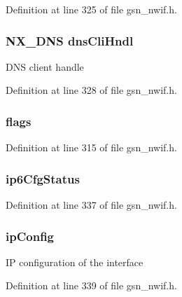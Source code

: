 Definition at line 325 of file gsn\_\-nwif.h.

\hypertarget{a00167_abde614bf82e24c537f1b86d562bd9402}{
\subsubsection[{dnsCliHndl}]{\setlength{\rightskip}{0pt plus 5cm}NX\_\-DNS {\bf dnsCliHndl}}}
\label{a00167_abde614bf82e24c537f1b86d562bd9402}
DNS client handle 

Definition at line 328 of file gsn\_\-nwif.h.

\hypertarget{a00167_a4767d0f6570f98849cacbfa9a18ab612}{
\subsubsection[{flags}]{ {\bf flags}}}
\label{a00167_a4767d0f6570f98849cacbfa9a18ab612}


Definition at line 315 of file gsn\_\-nwif.h.

\hypertarget{a00167_a9b582be9b7498d93b39a9c866d7bc834}{
\subsubsection[{ip6CfgStatus}]{ {\bf ip6CfgStatus}}}
\label{a00167_a9b582be9b7498d93b39a9c866d7bc834}


Definition at line 337 of file gsn\_\-nwif.h.

\hypertarget{a00167_a1dede6b9b16f28827ae79e82aba27440}{
\subsubsection[{ipConfig}]{ {\bf ipConfig}}}
\label{a00167_a1dede6b9b16f28827ae79e82aba27440}
IP configuration of the interface 

Definition at line 339 of file gsn\_\-nwif.h.

